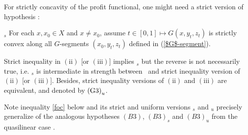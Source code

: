For strictly concavity of the profit functional, one might need a strict version of hypothesis \Gthree:

\Gthree$_{s}$ For each $x,x_0 \in X$ and $x\ne x_0$, assume $t \in [0,1] \longmapsto G(x, y_t, z_t)$ is strictly convex along all $G$-segments $(x_0, y_t, z_t)$ defined in (\ref{$G$-segment}).
\medskip

\begin{remark}\label{(C5)_s and (C5)_u}
	Strict inequality in $\mathrm{(ii)}$ [or $\mathrm{(iii)}$] implies \Gthree$_{s}$ but the reverse is not necessarily true, i.e. \Gthree$_{s}$ is intermediate in strength between \Gthree\ and strict inequality version of $\mathrm{(ii)}$ [or $\mathrm{(iii)}$]. Besides, strict inequality versions of $\mathrm{(ii)}$ and $\mathrm{(iii)}$ are equivalent, and denoted by ${\rm (G3)}_{u}$.
	
	Note inequality \eqref{foc} below and its strict and uniform versions \Gthree$_{s}$ and \Gthree$_{u}$
	precisely generalize of the analogous hypotheses $(B3)$, $(B3)_{s}$ and $(B3)_{u}$ from the quasilinear case 
	\cite{FigalliKimMcCann11}.
\end{remark}

